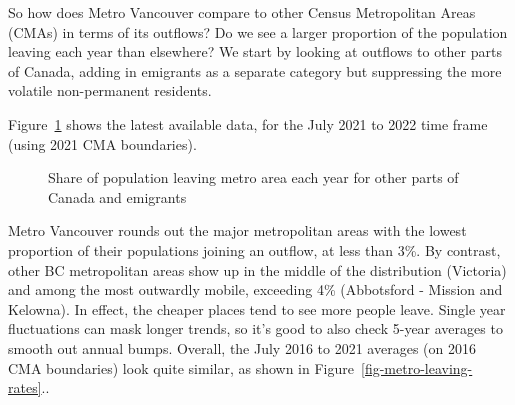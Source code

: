 \documentclass[
  letterpaper,
]{article}
\begin{document}
So how does Metro Vancouver compare to other Census Metropolitan Areas
(CMAs) in terms of its outflows? Do we see a larger proportion of the
population leaving each year than elsewhere? We start by looking at
outflows to other parts of Canada, adding in emigrants as a separate
category but suppressing the more volatile non-permanent residents.

Figure~\ref{fig-metro-leaving-rates_2021} shows the latest available
data, for the July 2021 to 2022 time frame (using 2021 CMA boundaries).

\begin{figure}[H]


\caption{\label{fig-metro-leaving-rates_2021}Share of population leaving
metro area each year for other parts of Canada and emigrants}

\end{figure}%

Metro Vancouver rounds out the major metropolitan areas with the lowest
proportion of their populations joining an outflow, at less than 3\%. By
contrast, other BC metropolitan areas show up in the middle of the
distribution (Victoria) and among the most outwardly mobile, exceeding
4\% (Abbotsford - Mission and Kelowna). In effect, the cheaper places
tend to see more people leave. Single year fluctuations can mask longer
trends, so it's good to also check 5-year averages to smooth out annual
bumps. Overall, the July 2016 to 2021 averages (on 2016 CMA boundaries)
look quite similar, as shown in Figure~\ref{fig-metro-leaving-rates}..
\end{document}
